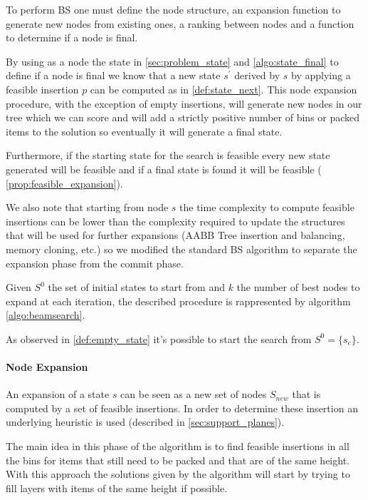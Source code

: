To perform BS one must define the node structure, an expansion function to generate new nodes from existing ones, a ranking between nodes and a function to determine if a node is final.

By using as a node the state in \cref{sec:problem_state} and \cref{algo:state_final} to define if a node is final we know that a new state $s^\prime$ derived by $s$ by applying a feasible insertion $p$ can be computed as in \cref{def:state_next}.
This node expansion procedure, with the exception of empty insertions, will generate new nodes in our tree which we can score and will add a strictly positive number of bins or packed items to the solution so eventually it will generate a final state.

Furthermore, if the starting state for the search is feasible every new state generated will be feasible and if a final state is found it will be feasible ( \cref{prop:feasible_expansion}).

We also note that starting from node $s$ the time complexity to compute feasible insertions can be lower than the complexity required to update the structures that will be used for further expansions (AABB Tree insertion and balancing, memory cloning, etc.) so we modified the standard BS algorithm to separate the expansion phase from the commit phase.

Given $S^0$ the set of initial states to start from and $k$ the number of best nodes to expand at each iteration, the described procedure is rappresented by algorithm \ref{algo:beamsearch}.

As observed in \cref{def:empty_state} it's possible to start the search from $S^0 = \{ s_e \}$.



\paragraph*{Node Expansion}

An expansion of a state $s$ can be seen as a new set of nodes $S_{new}$ that is computed by a set of feasible insertions.
In order to determine these insertion an underlying heuristic is used (described in \cref{sec:support_planes}).

The main idea in this phase of the algorithm is to find feasible insertions in all the bins for items that still need to be packed and that are of the same height.
With this approach the solutions given by the algorithm will start by trying to fill layers with items of the same height if possible.

